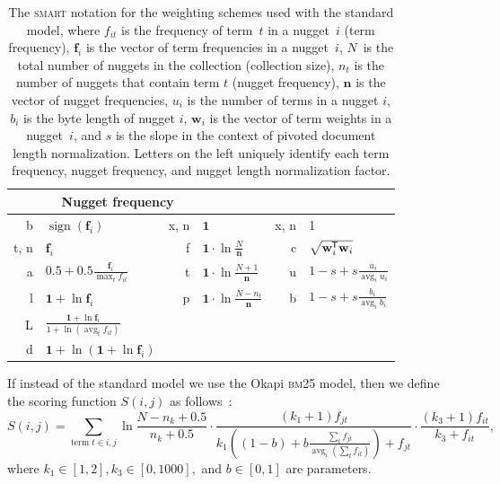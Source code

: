 \documentclass[
  digital, %
  notable, %
  lof,     %
  lot,     %
  nopalatino, color
]{fithesis3}
\newcommand{\op}[1]{\ensuremath{\operatorname{#1}}}
\newcommand{\avg}{\op{avg}}
\newcommand{\sign}{\op{sign}}
\def\abbr#1{\textsc{\MakeLowercase{#1}}}
\newcommand*{\tran}{^{\mkern-1.5mu\mathsf{T}}}
\begin{document}
\begin{table}[tb]
\centering
\begin{tabular}{>{\ttfamily}rl>{\ttfamily}rl>{\ttfamily}rl}
\multicolumn{2}{c}{Term frequency} &
  \multicolumn{2}{c}{Nugget frequency} &
  \multicolumn{2}{c}{Normalization} \\ \toprule
b & $\sign(\mathbf{f}_{i})$ &
  x\textrm{, }n & $\mathbf{1}$ &
  x\textrm{, }n\index{.n@\texttt{n}|emph} & 1 \\
t\textrm{, }n & $\mathbf{f}_{i}$ &
  f & $\mathbf{1}\cdot\ln\frac N{\mathbf{n}}$ &
  c & $\sqrt{\mathbf w_{i}\tran \mathbf w_{i}}$ \\
a & $\mathbf{0.5}+0.5\frac{\mathbf{f}_{i}}{\max_tf_{it}}$ &
  t\index{.t@\texttt{t}|emph}    & $\mathbf{1}\cdot\ln\frac{N+1}{\mathbf{n}}$ &
  u\index{.u@\texttt  {u}|emph}    & $1-s + s\frac{u_i}{\avg_iu_i}$ \\
l    & $\mathbf{1}+\ln \mathbf{f}_{i}$ &
  p    & $\mathbf{1}\cdot\ln\frac{N-n_t}{\mathbf{n}}$ &
  b\index{.b@\texttt  {b}|emph}    & $1-s + s\frac{b_i}{\avg_ib_i}$ \\
L    & $\frac{\mathbf1+\ln \mathbf{f}_{i}}{1+\ln(\avg_tf_{it})}$ & & & & \\
d    & $\mathbf1+\ln(\mathbf1+\ln \mathbf{f}_{i})$ & & & &\\
\end{tabular}
\caption[The \abbr{SMART} notation for the weighting schemes]{The \abbr{SMART}
  notation for the weighting schemes 
  used with the standard model, where $f_{it}$ is the
  frequency of term~$t$ in a nugget~$i$ (term frequency),
  $\mathbf{f}_i$ is the vector of term frequencies in
  a nugget~$i$, $N$~is the total number of nuggets in the
  collection (collection size), $n_t$ is the number of nuggets
  that contain term $t$ (nugget frequency), $\mathbf{n}$
  is the vector of nugget frequencies, $u_i$
  is the number of terms in a nugget $i$, $b_i$ is the byte length of nugget
  $i$, $\mathbf{w}_{i}$ is the vector of term weights in a nugget~$i$, and
  $s$ is the slope in the context of pivoted document length
  normalization.  Letters on the left uniquely identify each term frequency,
  nugget frequency, and nugget length normalization factor.}
\label{tab:segmentation-smart}
\end{table}

If instead of the standard model we use the Okapi
\abbr{BM}25 model\index{Okapi \abbr{BM}25|emph}, then we define the scoring
function $S(i,j)$ as follows~\cite{singhal01}:
\begin{equation*}
  \textstyle
  S(i,j) = \sum_{\textrm{term }t\in i,j}
  \ln\frac{N-n_k+0.5}{n_k+0.5}\cdot
  \frac{(k_1+1)f_{jt}}{k_1\left((1-b)+b\frac{\sum_t
  f_{jt}}{\avg_i(\sum_t f_{it})}\right)+f_{jt}}\cdot\frac{(k_3+1)f_{it}}{k_3+f_{it}},
\end{equation*}
where $k_1\in[1,2], k_3\in[0,1000],$ and $b\in[0,1]$ are parameters.%
\end{document}
